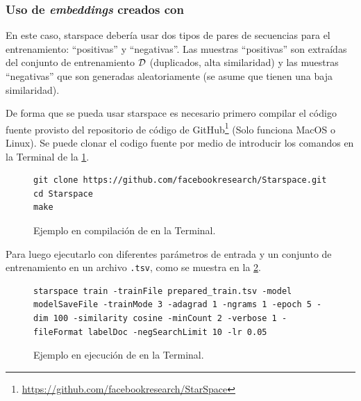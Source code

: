 \subsubsection{Uso de \emph{embeddings} creados con }
En este caso, \gls{starspace} debería usar dos tipos de pares de secuencias para el entrenamiento: ``positivas'' y ``negativas''. Las muestras ``positivas'' son extraídas del conjunto de entrenamiento $\mathcal{D}$ (duplicados, alta similaridad) y las muestras ``negativas'' que son generadas aleatoriamente (se asume que tienen una baja similaridad).

De forma que se pueda usar \gls{starspace} es necesario primero compilar el código fuente provisto del repositorio de código de GitHub\footnote{\href{https://github.com/facebookresearch/StarSpace}{https://github.com/facebookresearch/StarSpace}} (Solo funciona MacOS o Linux). Se puede clonar el codigo fuente por medio de introducir los  comandos en la Terminal de la \cref{fig:starspace-terminal-compilation}.

\begin{figure}[ht]
\centering
\begin{minipage}{0.9\textwidth}
\begin{verbatim}
git clone https://github.com/facebookresearch/Starspace.git
cd Starspace
make
\end{verbatim}
\end{minipage}
\caption{Ejemplo en compilación de  en la Terminal.} 
\label{fig:starspace-terminal-compilation}
\end{figure}

Para luego ejecutarlo con diferentes parámetros de entrada y un conjunto de entrenamiento en un archivo \texttt{.tsv}, como se muestra en la \cref{fig:starspace-terminal-execution}.

\begin{figure}[ht]
\centering
\begin{minipage}{0.9\textwidth}
\begin{verbatim}
starspace train -trainFile prepared_train.tsv -model modelSaveFile -trainMode 3 -adagrad 1 -ngrams 1 -epoch 5 -dim 100 -similarity cosine -minCount 2 -verbose 1 -fileFormat labelDoc -negSearchLimit 10 -lr 0.05
\end{verbatim}
\end{minipage}
\caption{Ejemplo en ejecución de  en la Terminal.} 
\label{fig:starspace-terminal-execution}
\end{figure}

